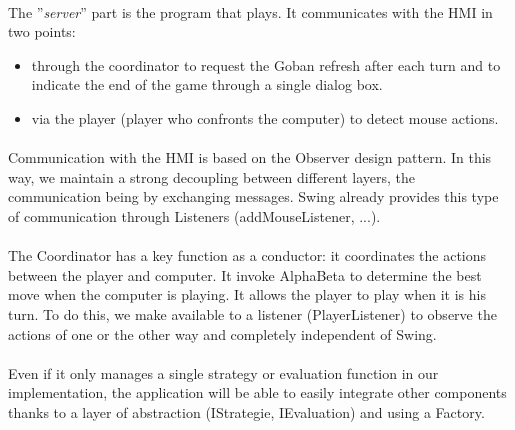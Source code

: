\documentclass[a4paper,12pt]{report}
\begin{document}
    \paragraph*{}
      The ''\textit{server}'' part is the program that plays. It communicates with the HMI in two points:
      \begin{itemize}
	\item through the coordinator to request the Goban refresh after each turn and to indicate the end of the game through a single dialog box.
	\item via the player (player who confronts the computer) to detect mouse actions.
    \end{itemize}

    \paragraph*{}
      Communication with the HMI is based on the Observer design pattern. In this way, we maintain a strong decoupling between different layers,
      the communication being by exchanging messages. Swing already provides this type of communication through Listeners (addMouseListener, ...).
    \paragraph*{}
    The Coordinator has a key function as a conductor: it coordinates the actions between the player and computer.
    It invoke AlphaBeta to determine the best move when the computer is playing. It allows the player to play when it is his turn.
    To do this, we make available to a listener (PlayerListener) to observe the actions of one or the other way and completely independent of Swing.
    
    \paragraph*{}
    Even if it only manages a single strategy or evaluation function in our implementation,
    the application will be able to easily integrate other components thanks to a layer of abstraction (IStrategie, IEvaluation) and using a Factory.
    
\end{document}
